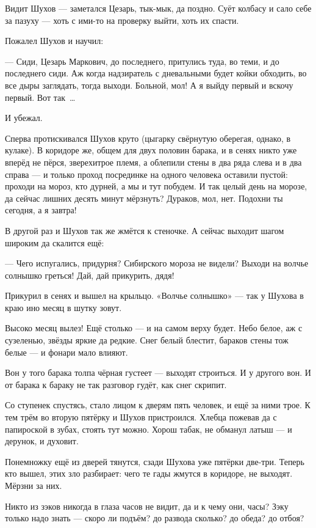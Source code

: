 Видит Шухов --- заметался Цезарь, тык-мык, да поздно. Суёт колбасу и сало себе за пазуху --- хоть 
с ими-то на проверку выйти, хоть их спасти.

Пожалел Шухов и научил:

--- Сиди, Цезарь Маркович, до последнего, притулись туда, во теми, и до последнего сиди. Аж 
когда надзиратель с дневальными будет койки обходить, во все дыры заглядать, тогда выходи. 
Больной, мол! А я выйду первый и вскочу первый. Вот так~\dots{}

И убежал.

Сперва протискивался Шухов круто (цыгарку свёрнутую оберегая, однако, в кулаке). В коридоре 
же, общем для двух половин барака, и в сенях никто уже вперёд не пёрся, зверехитрое племя, а 
облепили стены в два ряда слева и в два справа --- и только проход посрединке на одного 
человека оставили пустой: проходи на мороз, кто дурней, а мы и тут побудем. И так целый день на 
морозе, да сейчас лишних десять минут мёрзнуть? Дураков, мол, нет. Подохни ты сегодня, а я 
завтра!

В другой раз и Шухов так же жмётся к стеночке. А сейчас выходит шагом широким да скалится ещё:

--- Чего испугались, придурня? Сибирского мороза не видели? Выходи на волчье солнышко греться! 
Дай, дай прикурить, дядя!

Прикурил в сенях и вышел на крыльцо. «Волчье солнышко» --- так у Шухова в краю ино месяц в 
шутку зовут.

Высоко месяц вылез! Ещё столько --- и на самом верху будет. Небо белое, аж с сузеленью, звёзды 
яркие да редкие. Снег белый блестит, бараков стены тож белые --- и фонари мало влияют.

Вон у того барака толпа чёрная густеет --- выходят строиться. И у другого вон. И от барака к 
бараку не так разговор гудёт, как снег скрипит.

Со ступенек спустясь, стало лицом к дверям пять человек, и ещё за ними трое. К тем трём во 
вторую пятёрку и Шухов пристроился. Хлебца пожевав да с папироской в зубах, стоять тут можно. 
Хорош табак, не обманул латыш --- и дерунок, и духовит.

Понемножку ещё из дверей тянутся, сзади Шухова уже пятёрки две-три. Теперь кто вышел, этих 
зло разбирает: чего те гады жмутся в коридоре, не выходят. Мёрзни за них.

Никто из зэков никогда в глаза часов не видит, да и к чему они, часы? Зэку только надо знать --- 
скоро ли подъём? до развода сколько? до обеда? до отбоя?

